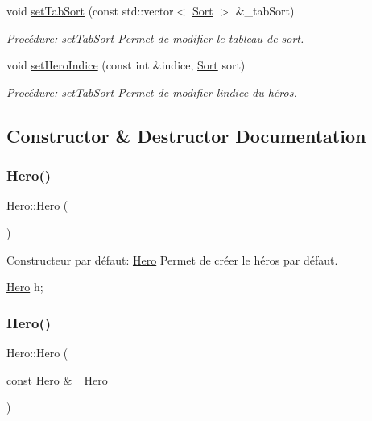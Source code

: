 \begin{DoxyCompactItemize}
void \hyperlink{classHero_ae7c967e805c745f63534fa342b395954}{set\+Tab\+Sort} (const std\+::vector$<$ \hyperlink{classSort}{Sort} $>$ \&\+\_\+tab\+Sort)
\begin{DoxyCompactList}\small\item\em Procédure\+: set\+Tab\+Sort Permet de modifier le tableau de sort. \end{DoxyCompactList}\item 
void \hyperlink{classHero_a48cd72ba539d261504a582a63d7c9e5f}{set\+Hero\+Indice} (const int \&indice, \hyperlink{classSort}{Sort} sort)
\begin{DoxyCompactList}\small\item\em Procédure\+: set\+Tab\+Sort Permet de modifier l\textquotesingle{}indice du héros. \end{DoxyCompactList}\end{DoxyCompactItemize}


\subsection{Constructor \& Destructor Documentation}
\mbox{\label{classHero_ab5920677a4b5cb59d6f513922d037dca}} 
\subsubsection{\texorpdfstring{Hero()}{Hero()}\hspace{0.1cm}{\footnotesize\ttfamily [1/3]}}
{\footnotesize\ttfamily Hero\+::\+Hero (\begin{DoxyParamCaption}{ }\end{DoxyParamCaption})}



Constructeur par défaut\+: \hyperlink{classHero}{Hero} Permet de créer le héros par défaut. 


\begin{DoxyCode}
\hyperlink{classHero}{Hero} h;
\end{DoxyCode}
 \mbox{\label{classHero_aaf432046f7dcf546db3e24c7976e8df7}} 
\subsubsection{\texorpdfstring{Hero()}{Hero()}\hspace{0.1cm}{\footnotesize\ttfamily [2/3]}}
{\footnotesize\ttfamily Hero\+::\+Hero (\begin{DoxyParamCaption}\item[{const \hyperlink{classHero}{Hero} \&}]{\+\_\+\+Hero }\end{DoxyParamCaption})}



